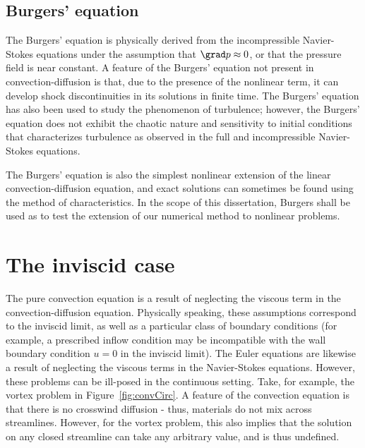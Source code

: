 \subsection{Burgers' equation}

The Burgers' equation is physically derived from the incompressible Navier-Stokes equations under the assumption that $\grad p \approx 0$, or that the pressure field is near constant. A feature of the Burgers' equation not present in convection-diffusion is that, due to the presence of the nonlinear term, it can develop shock discontinuities in its solutions in finite time.  The Burgers' equation has also been used to study the phenomenon of turbulence; however, the Burgers' equation does not exhibit the chaotic nature and sensitivity to initial conditions that characterizes turbulence as observed in the full and incompressible Navier-Stokes equations. 

The Burgers' equation is also the simplest nonlinear extension of the linear convection-diffusion equation, and exact solutions can sometimes be found using the method of characteristics. In the scope of this dissertation, Burgers shall be used as to test the extension of our numerical method to nonlinear problems. 

\section{The inviscid case}

The pure convection equation is a result of neglecting the viscous term in the convection-diffusion equation. Physically speaking, these assumptions correspond to the inviscid limit, as well as a particular class of boundary conditions (for example, a prescribed inflow condition may be incompatible with the wall boundary condition $u = 0$ in the inviscid limit).  The Euler equations are likewise a result of neglecting the viscous terms in the Navier-Stokes equations.  However, these problems can be ill-posed in the continuous setting.  Take, for example, the vortex problem in Figure~\ref{fig:convCirc}.  A feature of the convection equation is that there is no crosswind diffusion - thus, materials do not mix across streamlines.  However, for the vortex problem, this also implies that the solution on any closed streamline can take any arbitrary value, and is thus undefined. 

